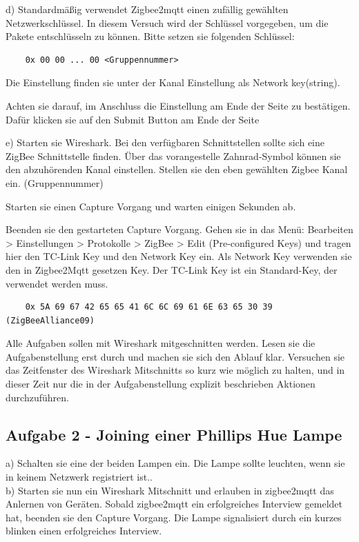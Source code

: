 d) Standardmäßig verwendet Zigbee2mqtt einen zufällig gewählten Netzwerkschlüssel. In diesem Versuch wird der Schlüssel vorgegeben, um die Pakete
entschlüsseln zu können. Bitte setzen sie folgenden Schlüssel:

\begin{lstlisting}
    0x 00 00 ... 00 <Gruppennummer>
\end{lstlisting}

Die Einstellung finden sie unter der Kanal Einstellung als \grqq Network key(string)\grqq{}.

Achten sie darauf, im Anschluss die Einstellung am Ende der Seite zu bestätigen. Dafür klicken sie auf den 
\grqq Submit \grqq{} Button am Ende der Seite

e) Starten sie Wireshark. Bei den verfügbaren Schnittstellen sollte sich eine ZigBee Schnittstelle finden. Über das vorangestelle Zahnrad-Symbol können sie den abzuhörenden
 Kanal einstellen. Stellen sie den eben gewählten Zigbee Kanal ein. (Gruppennummer)

Starten sie einen Capture Vorgang und warten einigen Sekunden ab.

Beenden sie den gestarteten Capture Vorgang. Gehen sie in das Menü: Bearbeiten > Einstellungen > Protokolle > ZigBee > Edit (Pre-configured Keys) und tragen
hier den \grqq TC-Link Key\grqq{} und den \grqq Network Key\grqq{} ein. Als \grqq Network Key\grqq{} verwenden sie den in Zigbee2Mqtt gesetzen Key. Der \grqq TC-Link Key\grqq{} ist ein
Standard-Key, der verwendet werden muss.
\begin{lstlisting}
    0x 5A 69 67 42 65 65 41 6C 6C 69 61 6E 63 65 30 39 (ZigBeeAlliance09)
\end{lstlisting}

\begin{Hinweis}
    Alle Aufgaben sollen mit Wireshark mitgeschnitten werden. Lesen sie die Aufgabenstellung erst durch und machen sie sich den Ablauf klar. Versuchen sie das 
    Zeitfenster des Wireshark Mitschnitts so kurz wie möglich zu halten, und in dieser Zeit nur die in der Aufgabenstellung explizit beschrieben Aktionen durchzuführen.
\end{Hinweis}

\subsection{Aufgabe 2 - Joining einer Phillips Hue Lampe}
a) Schalten sie eine der beiden Lampen ein. Die Lampe sollte leuchten, wenn sie in keinem Netzwerk registriert ist..\\
b) Starten sie nun ein Wireshark Mitschnitt und erlauben in zigbee2mqtt das Anlernen von Geräten. Sobald zigbee2mqtt ein erfolgreiches Interview gemeldet hat, beenden sie
den Capture Vorgang. Die Lampe signalisiert durch ein kurzes blinken einen erfolgreiches Interview.

